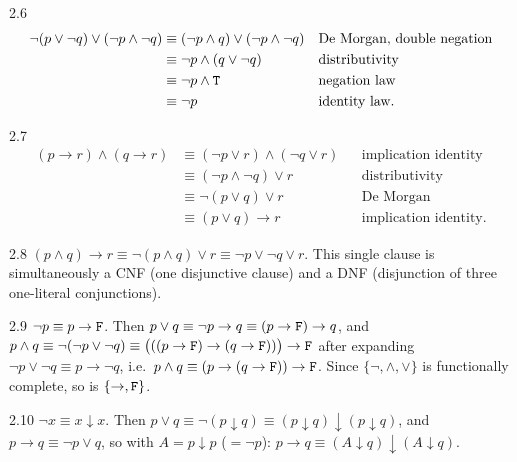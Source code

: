 \begin{solution}{2.6}
\begin{align*}
\neg(p \vee \neg q) \vee (\neg p \wedge \neg q)
&\equiv (\neg p \wedge q) \vee (\neg p \wedge \neg q) && \text{De Morgan, double negation}\\
&\equiv \neg p \wedge (q \vee \neg q) && \text{distributivity}\\
&\equiv \neg p \wedge \mathtt{T} && \text{negation law}\\
&\equiv \neg p && \text{identity law.}
\end{align*}
\end{solution}

\begin{solution}{2.7}
\begin{align*}
(p \to r) \wedge (q \to r)
&\equiv (\neg p \vee r) \wedge (\neg q \vee r) && \text{implication identity}\\
&\equiv (\neg p \wedge \neg q) \vee r && \text{distributivity}\\
&\equiv \neg(p \vee q) \vee r && \text{De Morgan}\\
&\equiv (p \vee q) \to r && \text{implication identity.}
\end{align*}
\end{solution}

\begin{solution}{2.8}
$(p \wedge q) \to r \equiv \neg(p \wedge q) \vee r
\equiv \neg p \vee \neg q \vee r$. This single clause is simultaneously a CNF
(one disjunctive clause) and a DNF (disjunction of three one-literal
conjunctions).
\end{solution}

\begin{solution}{2.9}
$\neg p \equiv p \to \mathtt{F}$. Then
$p \vee q \equiv \neg p \to q \equiv (p \to \mathtt{F}) \to q$, and
$p \wedge q \equiv \neg(\neg p \vee \neg q)
\equiv \bigl(((p \to \mathtt{F}) \to (q \to \mathtt{F}))\bigr) \to \mathtt{F}$ after expanding
$\neg p \vee \neg q \equiv p \to \neg q$, i.e.\
$p \wedge q \equiv (p \to (q \to \mathtt{F})) \to \mathtt{F}$. Since
$\{\neg, \wedge, \vee\}$ is functionally complete, so is $\{\to, \mathtt{F}\}$.
\end{solution}

\begin{solution}{2.10}
$\neg x \equiv x \downarrow x$. Then
$p \vee q \equiv \neg(p \downarrow q)
\equiv (p \downarrow q) \downarrow (p \downarrow q)$, and
$p \to q \equiv \neg p \vee q$, so with $A = p \downarrow p$ ($= \neg p$):
$p \to q \equiv (A \downarrow q) \downarrow (A \downarrow q)$.
\end{solution}


